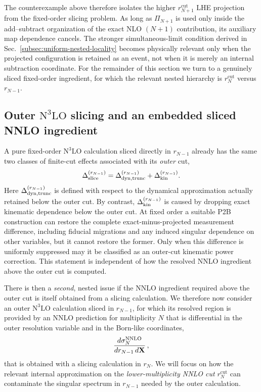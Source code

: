 \documentclass[11pt]{article}
\newcommand{\rnm}{r_{N-1}}
\newcommand{\rn}{r_N}
\newcommand{\rnp}{r_{N+1}}
\newcommand{\cut}{\mathrm{cut}}
\begin{document}
The counterexample above therefore isolates the higher $\rnp^{\cut}$ LHE projection from the fixed-order
slicing problem. As long as $\Pi_{N+1}$ is used only inside the add--subtract organization of the exact NLO
$(N+1)$ contribution, its auxiliary map dependence cancels. The stronger simultaneous-limit condition derived
in Sec.~\ref{subsec:uniform-nested-locality} becomes physically relevant only when the projected configuration
is retained as an event, not when it is merely an internal subtraction coordinate. For the remainder of this
section we turn to a genuinely sliced fixed-order ingredient, for which the relevant nested hierarchy is
$\rn^{\cut}$ versus $\rnm$.

\subsection{Outer $\mathrm{N}^3\mathrm{LO}$ slicing and an embedded sliced NNLO ingredient}
\label{subsec:n3lo-embedding}

A pure fixed-order $\mathrm{N}^3\mathrm{LO}$ calculation sliced directly in $\rnm$ already has the same two
classes of finite-cut effects associated with its \emph{outer} cut,
\begin{equation}
\Delta_{\rm slice}^{(\rnm)}
=
\Delta_{\rm dyn,trunc}^{(\rnm)}
+
\Delta_{\rm kin}^{(\rnm)}.
\label{eq:n3lo-outer-pc-decomposition}
\end{equation}
Here $\Delta_{\rm dyn,trunc}^{(\rnm)}$ is defined with respect to the dynamical approximation actually retained
below the outer cut.  By contrast,
$\Delta_{\rm kin}^{(\rnm)}$ is caused by dropping exact kinematic dependence below the outer cut. At fixed
order a suitable P2B construction can restore the complete exact-minus-projected measurement difference,
including fiducial migrations and any induced singular dependence on other variables, but it cannot restore
the former. Only when this difference is uniformly suppressed may it be classified as an outer-cut kinematic
power correction. This statement is independent of how the resolved NNLO ingredient above the outer cut is
computed.

There is then a \emph{second}, nested issue if the NNLO ingredient required above the outer cut is itself
obtained from a slicing calculation. We therefore now consider an outer $\mathrm{N}^3\mathrm{LO}$ calculation sliced in
$\rnm$, for which its resolved region is provided by an NNLO prediction for multiplicity $N$ that is differential in the
outer resolution variable and in the Born-like coordinates,
\begin{equation}
\frac{d\sigma_N^{\rm NNLO}}
{d\rnm\,d\mathbf X}\,,
\label{eq:nnlo-ingredient-for-n3lo}
\end{equation} that is obtained with a slicing calculation in $\rn$. We will focus on how the relevant
internal approximation on the \emph{lower-multiplicity NNLO cut} $\rn^{\cut}$ can
contaminate the singular spectrum in $\rnm$ needed by the outer calculation.
\end{document}
